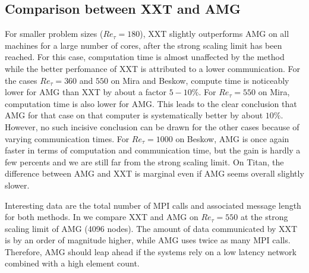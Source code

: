 \documentclass{sig-alternate}
\begin{document}
\subsection{Comparison between XXT and AMG}

For smaller problem sizes ($Re_{\tau}=180$), XXT slightly outperforms AMG on all machines
for a large number of cores, after the strong scaling limit has been reached. 
For this case, computation time is almost unaffected by the method while the better perfomance
of XXT is attributed to a lower communication. For the cases $Re_{\tau}=360$ and 
$550$ on Mira and Beskow, compute time is noticeably lower for AMG than XXT by
about a factor $5-10\%$. For $Re_{\tau}=550$ on Mira, computation time is also lower
for AMG. This leads to the clear conclusion that AMG for that case on that computer
is systematically better by about $10\%$. However, no such incisive conclusion can be drawn for the other
cases because of varying communication times. For $Re_{\tau}=1000$ on Beskow, 
AMG is once again faster in terms of computation and communication time, but the 
gain is hardly a few percents and we are still far from the strong scaling limit.
On Titan, the difference between AMG and XXT is marginal even if AMG seems overall
slightly slower.

Interesting data are the total number of MPI calls and associated message length
for both methods. In  we compare XXT and AMG on $Re_{\tau} = 550$ 
at the strong scaling limit of AMG (4096 nodes). The amount of data communicated 
by XXT is by an order of magnitude higher, while AMG uses twice as many MPI calls. 
Therefore, AMG should leap ahead if the systems rely on a low latency network 
combined with a high element count.
\end{document}
